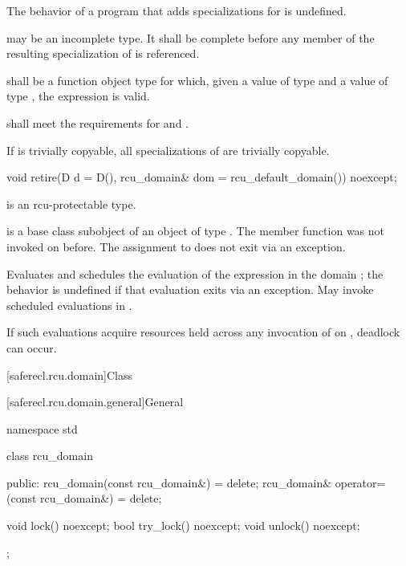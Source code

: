 \pnum
The behavior of a program that adds specializations for 
is undefined.

\pnum
{} may be an incomplete type.
It shall be complete before any member of the resulting specialization of
 is referenced.

\pnum
{} shall be a
function object type for which,
given a value  of type  and
a value  of type ,
the expression  is valid.

\pnum
{} shall meet the requirements for
 and .

\pnum
If  is trivially copyable,
all specializations of  are trivially copyable.

\begin{itemdecl}
void retire(D d = D(), rcu_domain& dom = rcu_default_domain()) noexcept;
\end{itemdecl}

\begin{itemdescr}
\pnum
\mandates
{} is an rcu-protectable type.

\pnum
\expects
{} is
a base class subobject of an object  of type .
The member function 
was not invoked on  before.
The assignment to  does not exit via an exception.

\pnum
\effects
Evaluates  and
schedules the evaluation of
the expression 
in the domain ;
the behavior is undefined if that evaluation exits via an exception.
May invoke scheduled evaluations in .

\begin{note}
If such evaluations acquire resources held across any invocation of
 on , deadlock can occur.
\end{note}
\end{itemdescr}

[saferecl.rcu.domain]{Class }

[saferecl.rcu.domain.general]{General}

\begin{codeblock}
namespace std {
  class rcu_domain {
  public:
    rcu_domain(const rcu_domain&) = delete;
    rcu_domain& operator=(const rcu_domain&) = delete;

    void lock() noexcept;
    bool try_lock() noexcept;
    void unlock() noexcept;
  };
}
\end{codeblock}


